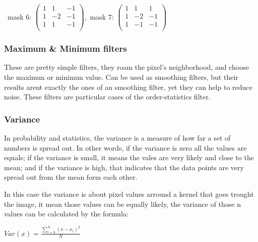 \documentclass[a4paper]{article}
\begin{document}
\begin{centering}
\ mask 6: \begin{math}
   \begin{pmatrix} 
   1 & 1 & -1 \\ 
   1 & -2 & -1 \\
   1 & 1 & -1 \\ 
   \end{pmatrix}
\end{math},\  mask 7: \begin{math}
   \begin{pmatrix} 
   1 & 1 & 1 \\ 
   1 & -2 & -1 \\
   1 & -1 & -1 \\ 
   \end{pmatrix}
\end{math}\\
\end{centering}
\subsubsection{Maximum \& Minimum filters}

These are pretty simple filters, they roam the pixel's neighborhood, and choose the maximun or minimun value. Can be used as smoothing filters, but their results arent exactly the ones of an smoothing filter, yet they can help to reduce noise. These filters are particular cases of the order-statistics filter.

\subsubsection{Variance}

In probability and statistics, the variance is a measure of how far a set of numbers is spread out. In other words, if the variance is zero all the values are equals; if the variance is small, it means the vales are very likely and close  to the mean; and if the variance is high, that indicates that the data points are very spread out from the mean form each other.

In this case the variance is about pixel values arround a kernel that goes trought the image, it mean those values can be equally likely, the variance of those n values can be calculated by the formula: \\

\begin{center}
\begin{math}
Var(x)= \frac{\sum \limits_{i=0}^{N} (\bar x - x_i)^2}{N}
\end{math}
\end{center}
\end{document}
